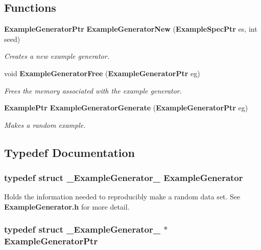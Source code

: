 \subsection*{Functions}
\begin{CompactItemize}
\item 
{\bf Example\-Generator\-Ptr} {\bf Example\-Generator\-New} ({\bf Example\-Spec\-Ptr} es, int seed)
\begin{CompactList}\small\item\em Creates a new example generator. \item\end{CompactList}\item 
void {\bf Example\-Generator\-Free} ({\bf Example\-Generator\-Ptr} eg)
\begin{CompactList}\small\item\em Frees the memory associated with the example generator. \item\end{CompactList}\item 
{\bf Example\-Ptr} {\bf Example\-Generator\-Generate} ({\bf Example\-Generator\-Ptr} eg)
\begin{CompactList}\small\item\em Makes a random example. \item\end{CompactList}\end{CompactItemize}


\subsection{Typedef Documentation}
\subsubsection{\setlength{\rightskip}{0pt plus 5cm}typedef struct {\bf \_\-Example\-Generator\_\-}  {\bf Example\-Generator}}\label{ExampleGenerator_8h_a0}


Holds the information needed to reproducibly make a random data set. See {\bf Example\-Generator.h} for more detail. 

\subsubsection{\setlength{\rightskip}{0pt plus 5cm}typedef struct {\bf \_\-Example\-Generator\_\-} $\ast$ {\bf Example\-Generator\-Ptr}}\label{ExampleGenerator_8h_a1}


